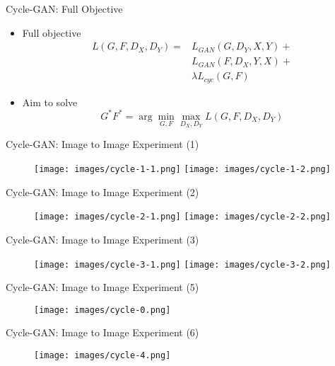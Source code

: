 \documentclass[handout]{beamer}
\begin{document}
\begin{frame}[<+->]{Cycle-GAN: Full Objective}
	\begin{itemize}
		\item Full objective
		\begin{align*}
			L(G, F, D_X, D_Y) = &L_{GAN}(G, D_Y, X, Y) + \\ &L_{GAN}(F, D_X, Y, X) + \\ &\lambda L_{cyc}(G, F)
		\end{align*}
		\item Aim to solve
		$$G^* F^* = \arg \min_{G, F} \max_{D_X, D_Y} L(G, F, D_X, D_Y)$$
	\end{itemize}
\end{frame}

\begin{frame}{Cycle-GAN: Image to Image Experiment (1)}
	\begin{figure}
		\centering
		\texttt{[image: images/cycle-1-1.png]}
		\texttt{[image: images/cycle-1-2.png]}
	\end{figure}
\end{frame}

\begin{frame}{Cycle-GAN: Image to Image Experiment (2)}
	\begin{figure}
		\centering
		\texttt{[image: images/cycle-2-1.png]}
		\texttt{[image: images/cycle-2-2.png]}
	\end{figure}
\end{frame}

\begin{frame}{Cycle-GAN: Image to Image Experiment (3)}
	\begin{figure}
		\centering
		\texttt{[image: images/cycle-3-1.png]}
		\texttt{[image: images/cycle-3-2.png]}
	\end{figure}
\end{frame}

\begin{frame}{Cycle-GAN: Image to Image Experiment (5)}
	\begin{figure}
		\centering
		\texttt{[image: images/cycle-0.png]}
	\end{figure}
\end{frame}

\begin{frame}{Cycle-GAN: Image to Image Experiment (6)}
	\begin{figure}
		\centering
		\texttt{[image: images/cycle-4.png]}
	\end{figure}
\end{frame}
\end{document}
